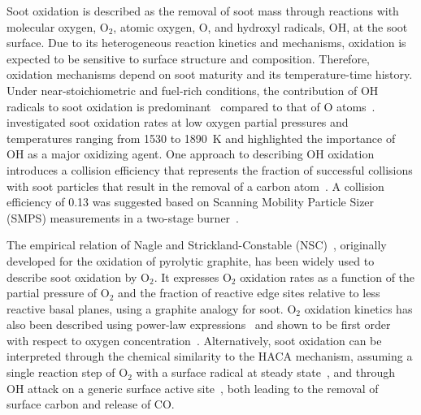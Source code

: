Soot oxidation is described as the removal of soot mass through reactions with molecular oxygen, O$_2$, atomic oxygen, O, and hydroxyl radicals, OH, at the soot surface. Due to its heterogeneous reaction kinetics and mechanisms, oxidation is expected to be sensitive to surface structure and composition. Therefore, oxidation mechanisms depend on soot maturity and its temperature-time history. Under near-stoichiometric and fuel-rich conditions, the contribution of OH radicals to soot oxidation is predominant~\citep{neoh1981soot} compared to that of O atoms~\citep{lighty2009soot}. \citet{fenimore1967oxidation} investigated soot oxidation rates at low oxygen partial pressures and temperatures ranging from 1530 to 1890~K and highlighted the importance of OH as a major oxidizing agent. One approach to describing OH oxidation introduces a collision efficiency that represents the fraction of successful collisions with soot particles that result in the removal of a carbon atom~\citep{neoh1981soot}. A collision efficiency of 0.13 was suggested based on Scanning Mobility Particle Sizer (SMPS) measurements in a two-stage burner~\citep{bartok1991fossil}.


The empirical relation of Nagle and Strickland-Constable (NSC)~\citep{nagle1962oxidation}, originally developed for the oxidation of pyrolytic graphite, has been widely used to describe soot oxidation by O$_2$. It expresses O$_2$ oxidation rates as a function of the partial pressure of O$_2$ and the fraction of reactive edge sites relative to less reactive basal planes, using a graphite analogy for soot. O$_2$ oxidation kinetics has also been described using power-law expressions~\cite{lee1962rate} and shown to be first order with respect to oxygen concentration~\citep{neeft1997kinetics}. Alternatively, soot oxidation can be interpreted through the chemical similarity to the HACA mechanism, assuming a single reaction step of O$_2$ with a surface radical at steady state~\citep{frenklach1991detailed}, and through OH attack on a generic surface active site~\citep{neoh1981soot}, both leading to the removal of surface carbon and release of CO.

